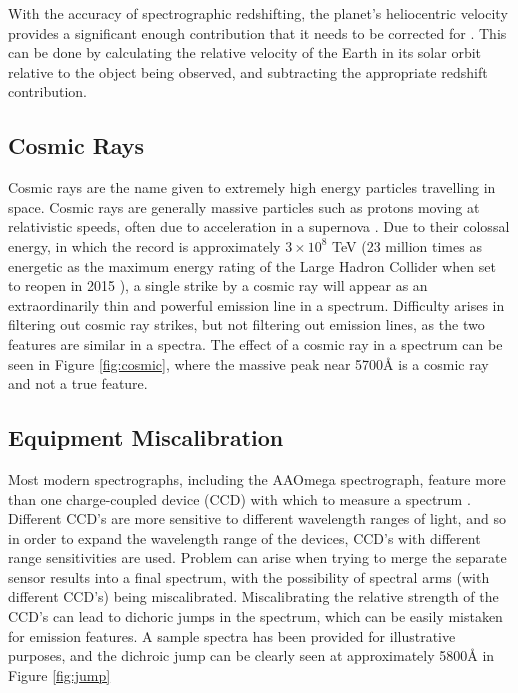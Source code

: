 \documentclass[titlesmallcaps, examinerscopy, copyrightpage]{uqthesis}
\begin{document}
With the accuracy of spectrographic redshifting, the planet's heliocentric velocity provides a significant enough contribution that it needs to be corrected for \cite{colless20012df,baldry2014galaxy}. This can be done by calculating the relative velocity of the Earth in its solar orbit relative to the object being observed, and subtracting the appropriate redshift contribution.

\subsection{Cosmic Rays}

Cosmic rays are the name given to extremely high energy particles travelling in space. Cosmic rays are generally massive particles such as protons moving at relativistic speeds, often due to acceleration in a supernova \cite{ackermann2013detection}. Due to their colossal energy, in which the record is approximately $3\times10^{8}$ TeV (23 million times as energetic as the maximum energy rating of the Large Hadron Collider when set to reopen in 2015 \cite{lhc}), a single strike by a cosmic ray will appear as an extraordinarily thin and powerful emission line in a spectrum. Difficulty arises in filtering out cosmic ray strikes, but not filtering out emission lines, as the two features are similar in a spectra. The effect of a cosmic ray in a spectrum can be seen in Figure \ref{fig:cosmic}, where the massive peak near 5700{\AA} is a cosmic ray and not a true feature.


\subsection{Equipment Miscalibration}

Most modern spectrographs, including the AAOmega spectrograph, feature more than one charge-coupled device (CCD) with which to measure a spectrum \cite{aaomega}. Different CCD's are more sensitive to different wavelength ranges of light, and so in order to expand the wavelength range of the devices, CCD's with different range sensitivities are used. Problem can arise when trying to merge the separate sensor results into a final spectrum, with the possibility of spectral arms (with different CCD's) being miscalibrated. Miscalibrating the relative strength of the CCD's can lead to dichoric jumps in the spectrum, which can be easily mistaken for emission features. A sample spectra has been provided for illustrative purposes, and the dichroic jump can be clearly seen at approximately 5800{\AA} in Figure \ref{fig:jump}
\end{document}
